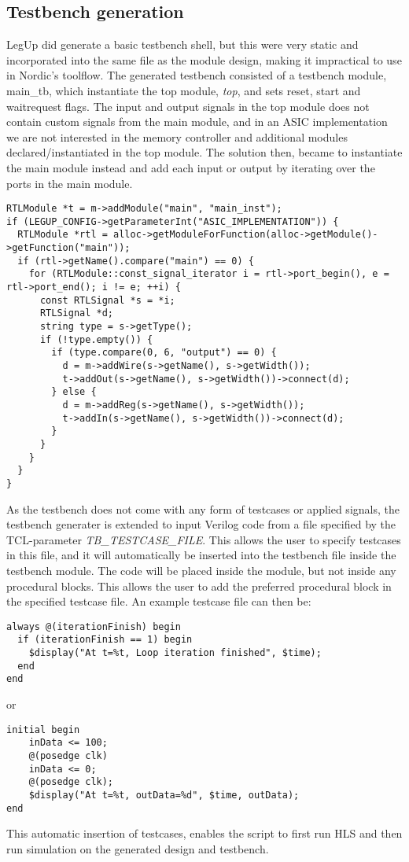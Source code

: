 \subsection{\label{subsec:tbgen}Testbench generation}
LegUp did generate a basic testbench shell, but this were very static and incorporated into the same file as the module design, making it impractical to use in Nordic's toolflow. The generated testbench consisted of a testbench module, main\_tb, which instantiate the top module, \textit{top}, and sets reset, start and waitrequest flags. The input and output signals in the top module does not contain custom signals from the main module, and in an ASIC implementation we are not interested in the memory controller and additional modules declared/instantiated in the top module. The solution then, became to instantiate the main module instead and add each input or output by iterating over the ports in the main module.

\begin{lstlisting}
RTLModule *t = m->addModule("main", "main_inst");
if (LEGUP_CONFIG->getParameterInt("ASIC_IMPLEMENTATION")) {
  RTLModule *rtl = alloc->getModuleForFunction(alloc->getModule()->getFunction("main"));
  if (rtl->getName().compare("main") == 0) {
    for (RTLModule::const_signal_iterator i = rtl->port_begin(), e = rtl->port_end(); i != e; ++i) {
      const RTLSignal *s = *i;
      RTLSignal *d;
      string type = s->getType();
      if (!type.empty()) {
        if (type.compare(0, 6, "output") == 0) {
          d = m->addWire(s->getName(), s->getWidth());
          t->addOut(s->getName(), s->getWidth())->connect(d);
        } else {
          d = m->addReg(s->getName(), s->getWidth());
          t->addIn(s->getName(), s->getWidth())->connect(d);
        }
      }
    }
  }
}
\end{lstlisting}

As the testbench does not come with any form of testcases or applied signals, the testbench generater is extended to input Verilog code from a file specified by the TCL-parameter \textit{TB\_TESTCASE\_FILE}. This allows the user to specify testcases in this file, and it will automatically be inserted into the testbench file inside the testbench module. The code will be placed inside the module, but not inside any procedural blocks. This allows the user to add the preferred procedural block in the specified testcase file. An example testcase file can then be:

\lstset{language=Verilog, style=Verilogstyle}
\begin{lstlisting}
always @(iterationFinish) begin
  if (iterationFinish == 1) begin
    $display("At t=%t, Loop iteration finished", $time);
  end
end
\end{lstlisting}
or
\begin{lstlisting}
initial begin
    inData <= 100;
    @(posedge clk)
    inData <= 0;
    @(posedge clk);
    $display("At t=%t, outData=%d", $time, outData);
end
\end{lstlisting}
This automatic insertion of testcases, enables the script to first run HLS and then run simulation on the generated design and testbench.

